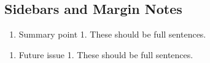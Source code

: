 \documentclass{ar-1col}
\begin{document}
\subsection{Sidebars and Margin Notes}
\begin{marginnote}[]
    
\end{marginnote}


\begin{summary}
  \begin{enumerate}
  \item Summary point 1. These should be full sentences.

  \end{enumerate}
\end{summary}

\begin{issues}
  \begin{enumerate}
  \item Future issue 1. These should be full sentences.
  \end{enumerate}
\end{issues}

\newpage


 

\clearpage



    
\end{document}
